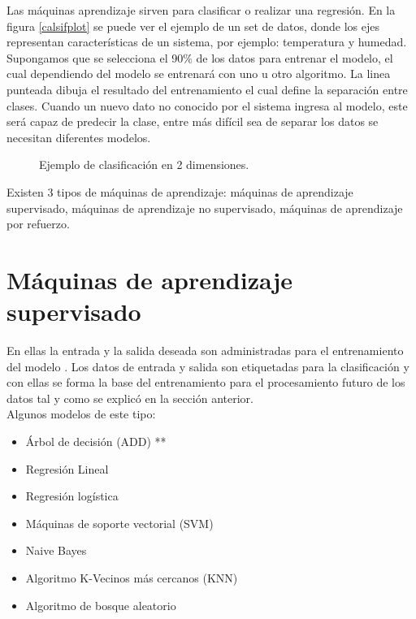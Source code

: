 \documentclass[twoside,spanish,ESP,MSc]{plantillaLabUPV}
\theoremstyle{definition}
\begin{document}
Las máquinas aprendizaje sirven para clasificar o realizar una regresión. En la figura \ref{calsifplot} se puede ver el ejemplo de un set de datos, donde los ejes representan características de un sistema, por ejemplo: temperatura y humedad. Supongamos que se selecciona el 90\% de los datos para entrenar el modelo, el cual dependiendo del modelo se entrenará con uno u otro algoritmo.
La linea punteada dibuja el resultado del entrenamiento el cual define la separación entre clases. Cuando un nuevo dato no conocido por el sistema ingresa al modelo, este será capaz de predecir la clase, entre más difícil sea de separar los datos se necesitan diferentes modelos.


\begin{figure}    
\centering
{}
\caption{Ejemplo de clasificación en 2 dimensiones.}
\label{clasifplot}
\end{figure}



Existen 3 tipos de máquinas de aprendizaje: máquinas de aprendizaje supervisado, máquinas de aprendizaje no supervisado, máquinas de aprendizaje por refuerzo.


\section{Máquinas de aprendizaje supervisado}


En ellas la entrada y la salida deseada son administradas para el entrenamiento del modelo  \cite{classifs}. Los datos de entrada y salida son etiquetadas para la clasificación y con ellas se forma la base del entrenamiento para el procesamiento futuro de los datos tal y como se explicó en la sección anterior.\\

Algunos modelos de este tipo:
\begin{itemize}
\itemsep 0em
 \item Árbol de decisión (ADD) **
 \item Regresión Lineal 
 \item Regresión logística 
 \item Máquinas de soporte vectorial (SVM) 
 \item Naive Bayes 
 \item Algoritmo K-Vecinos más cercanos (KNN)
 \item Algoritmo de bosque aleatorio
\end{itemize}
\end{document}
